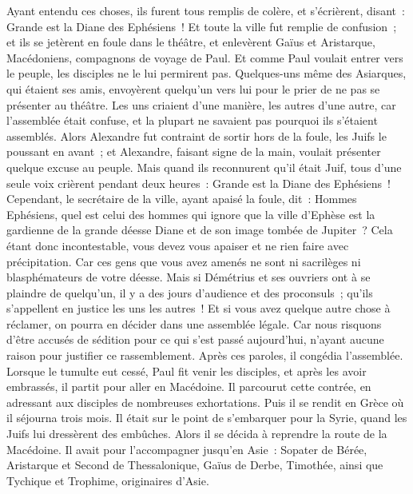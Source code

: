 \begin{multicols}{2}
Ayant entendu ces choses, ils furent tous remplis de colère, et s'écrièrent, disant~: Grande est la Diane des Ephésiens~!
Et toute la ville fut remplie de confusion~; et ils se jetèrent en foule dans le théâtre, et enlevèrent Gaïus et Aristarque, Macédoniens, compagnons de voyage de Paul.
Et comme Paul voulait entrer vers le peuple, les disciples ne le lui permirent pas.
Quelques-uns même des Asiarques, qui étaient ses amis, envoyèrent quelqu'un vers lui pour le prier de ne pas se présenter au théâtre.
Les uns criaient d'une manière, les autres d'une autre, car l'assemblée était confuse, et la plupart ne savaient pas pourquoi ils s'étaient assemblés.
Alors Alexandre fut contraint de sortir hors de la foule, les Juifs le poussant en avant~; et Alexandre, faisant signe de la main, voulait présenter quelque excuse au peuple.
Mais quand ils reconnurent qu'il était Juif, tous d'une seule voix crièrent pendant deux heures~: Grande est la Diane des Ephésiens~!
Cependant, le secrétaire de la ville, ayant apaisé la foule, dit~: Hommes Ephésiens, quel est celui des hommes qui ignore que la ville d'Ephèse est la gardienne de la grande déesse Diane et de son image tombée de Jupiter~?
Cela étant donc incontestable, vous devez vous apaiser et ne rien faire avec précipitation.
Car ces gens que vous avez amenés ne sont ni sacrilèges ni blasphémateurs de votre déesse.
Mais si Démétrius et ses ouvriers ont à se plaindre de quelqu'un, il y a des jours d'audience et des proconsuls~; qu'ils s'appellent en justice les uns les autres~!
Et si vous avez quelque autre chose à réclamer, on pourra en décider dans une assemblée légale.
Car nous risquons d'être accusés de sédition pour ce qui s'est passé aujourd'hui, n'ayant aucune raison pour justifier ce rassemblement. Après ces paroles, il congédia l'assemblée.
\VerseOne{}Lorsque le tumulte eut cessé, Paul fit venir les disciples, et après les avoir embrassés, il partit pour aller en Macédoine.
Il parcourut cette contrée, en adressant aux disciples de nombreuses exhortations.
Puis il se rendit en Grèce où il séjourna trois mois. Il était sur le point de s'embarquer pour la Syrie, quand les Juifs lui dressèrent des embûches. Alors il se décida à reprendre la route de la Macédoine.
Il avait pour l'accompagner jusqu'en Asie~: Sopater de Bérée, Aristarque et Second de Thessalonique, Gaïus de Derbe, Timothée, ainsi que Tychique et Trophime, originaires d'Asie.

\end{multicols}
